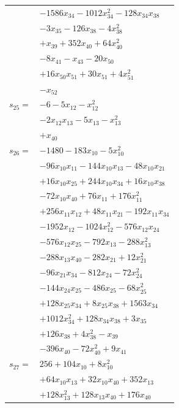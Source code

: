 \begin{longtable}{@{}r@{\;}l@{}}
 & \(\displaystyle -1586x_{34} -1012x_{34}^{2} -128x_{34}x_{38}\) \\
 & \(\displaystyle -3x_{35} -126x_{38} -4x_{38}^{2}\) \\
 & \(\displaystyle +x_{39} +352x_{40} +64x_{40}^{2}\) \\
 & \(\displaystyle -8x_{41} -x_{43} -20x_{50}\) \\
 & \(\displaystyle +16x_{50}x_{51} +30x_{51} +4x_{51}^{2}\) \\
 & \(\displaystyle -x_{52}\) \\[3pt]
\(s_{25}=\) & \(\displaystyle -6 -5x_{12} -x_{12}^{2}\) \\
 & \(\displaystyle -2x_{12}x_{13} -5x_{13} -x_{13}^{2}\) \\
 & \(\displaystyle +x_{40}\) \\[3pt]
\(s_{26}=\) & \(\displaystyle -1480 -183x_{10} -5x_{10}^{2}\) \\
 & \(\displaystyle -96x_{10}x_{11} -144x_{10}x_{13} -48x_{10}x_{21}\) \\
 & \(\displaystyle +16x_{10}x_{25} +244x_{10}x_{34} +16x_{10}x_{38}\) \\
 & \(\displaystyle -72x_{10}x_{40} +76x_{11} +176x_{11}^{2}\) \\
 & \(\displaystyle +256x_{11}x_{12} +48x_{11}x_{21} -192x_{11}x_{34}\) \\
 & \(\displaystyle -1952x_{12} -1024x_{12}^{2} -576x_{12}x_{24}\) \\
 & \(\displaystyle -576x_{12}x_{25} -792x_{13} -288x_{13}^{2}\) \\
 & \(\displaystyle -288x_{13}x_{40} -282x_{21} +12x_{21}^{2}\) \\
 & \(\displaystyle -96x_{21}x_{34} -812x_{24} -72x_{24}^{2}\) \\
 & \(\displaystyle -144x_{24}x_{25} -486x_{25} -68x_{25}^{2}\) \\
 & \(\displaystyle +128x_{25}x_{34} +8x_{25}x_{38} +1563x_{34}\) \\
 & \(\displaystyle +1012x_{34}^{2} +128x_{34}x_{38} +3x_{35}\) \\
 & \(\displaystyle +126x_{38} +4x_{38}^{2} -x_{39}\) \\
 & \(\displaystyle -396x_{40} -72x_{40}^{2} +9x_{41}\) \\[3pt]
\(s_{27}=\) & \(\displaystyle 256 +104x_{10} +8x_{10}^{2}\) \\
 & \(\displaystyle +64x_{10}x_{13} +32x_{10}x_{40} +352x_{13}\) \\
 & \(\displaystyle +128x_{13}^{2} +128x_{13}x_{40} +176x_{40}\) \\

\end{longtable}
